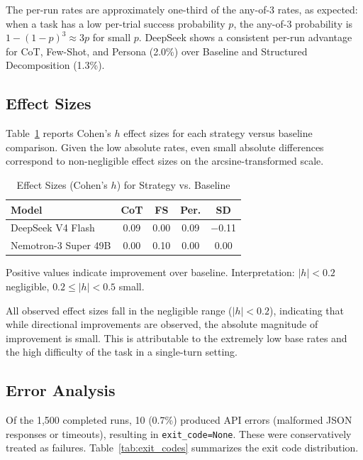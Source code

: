 \documentclass{ieeeaccess}
\begin{document}
The per-run rates are approximately one-third of the any-of-3 rates, as expected: when a task has a low per-trial success probability $p$, the any-of-3 probability is $1-(1-p)^3 \approx 3p$ for small $p$. DeepSeek shows a consistent per-run advantage for CoT, Few-Shot, and Persona (2.0\%) over Baseline and Structured Decomposition (1.3\%).

\subsection{Effect Sizes}

Table~\ref{tab:effect_sizes} reports Cohen's $h$ effect sizes for each strategy versus baseline comparison. Given the low absolute rates, even small absolute differences correspond to non-negligible effect sizes on the arcsine-transformed scale.

\begin{table}[t]
\caption{Effect Sizes (Cohen's $h$) for Strategy vs. Baseline}
\label{tab:effect_sizes}
\centering
\begin{tabular}{lcccc}
\toprule
\textbf{Model} & \textbf{CoT} & \textbf{FS} & \textbf{Per.} & \textbf{SD} \\
\midrule
DeepSeek V4 Flash & 0.09 & 0.00 & 0.09 & $-$0.11 \\
Nemotron-3 Super 49B & 0.00 & 0.10 & 0.00 & 0.00 \\
\bottomrule
\end{tabular}
\begin{tablenotes}
\footnotesize
\item Positive values indicate improvement over baseline. Interpretation: $|h|<0.2$ negligible, $0.2 \leq |h| < 0.5$ small.
\end{tablenotes}
\end{table}

All observed effect sizes fall in the negligible range ($|h| < 0.2$), indicating that while directional improvements are observed, the absolute magnitude of improvement is small. This is attributable to the extremely low base rates and the high difficulty of the task in a single-turn setting.

\subsection{Error Analysis}

Of the 1,500 completed runs, 10 (0.7\%) produced API errors (malformed JSON responses or timeouts), resulting in \texttt{exit\_code=None}. These were conservatively treated as failures. Table~\ref{tab:exit_codes} summarizes the exit code distribution.
\end{document}
